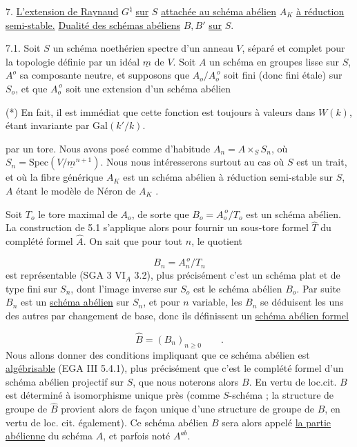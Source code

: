 7. \underline{L'extension de Raynaud} $G^\natural$ \underline{sur} $S$ \underline{attachée au schéma abélien} $A_K$ \underline{à réduction semi-stable.} \underline{Dualité des schémas abéliens} $B,B'$ \underline{sur} $S$.

7.1.  Soit $S$ un schéma noethérien spectre d'un anneau $V$, séparé et complet pour la topologie définie par un idéal $\underline{m}$ de $V$. Soit $A$ un schéma en groupes lisse sur $S$, $A^o$ sa composante neutre, et supposons que $A_o/A_o^{\,o}$ soit fini (donc fini étale) sur $S_o$, et que $A_o^{\,o}$ soit une extension d'un schéma abélien

(*) En fait, il est immédiat que cette fonction est toujours à valeurs dans $W(k)$, étant invariante par $\mathrm{Gal}(k'/k)$.



par un tore. Nous avons posé comme d'habitude $A_n = A\times_S S_n$, où $S_n = \mathrm{Spec}(V/\underline{m}^{n+1})$. Nous nous intéresserons surtout au cas où $S$ est un trait, et où la fibre générique $A_K$ est un schéma abélien à réduction semi-stable sur $S$, $A$ étant le modèle de Néron de $A_K$ .

Soit $T_o$ le tore maximal de $A_o$, de sorte que $B_o = A_o^{\,o}/T_o$ est un schéma abélien. La construction de 5.1 s'applique alors pour fournir un sous-tore formel $\hat{T}$ du complété formel $\hat{A}$. On sait que pour tout $n$, le quotient

\begin{equation}\tag{7.1.1}
B_n = A_n^{\,o}/T_n
\end{equation}
est représentable (SGA 3 $\mathrm{VI}_A$ 3.2), plus précisément c'est un schéma plat et de type fini sur $S_n$, dont l'image inverse sur $S_o$ est le schéma abélien $B_o$. Par suite $B_n$ est un \underline{schéma abélien} sur $S_n$, et pour $n$ variable, les $B_n$ se déduisent les uns des autres par changement de base, donc ils définissent un \underline{schéma abélien formel}

\begin{equation}\tag{7.1.2}
\hat{B} = (B_n)_{n \geqslant 0} \qquad .
\end{equation}
Nous allons donner des conditions impliquant que ce schéma abélien est \underline{algébrisable} (EGA III 5.4.1), plus précisément que c'est le complété formel d'un schéma abélien projectif sur $S$, que nous noterons alors $B$. En vertu de loc.cit. $B$ est déterminé à isomorphisme unique près (comme $S$-schéma ; la structure de groupe de $\hat{B}$ provient alors de façon unique d'une structure de groupe de $B$, en vertu de loc. cit. également). Ce schéma abélien $B$ sera alors appelé \underline{la partie abélienne} du schéma $A$, et parfois noté $A^{ab}$.


